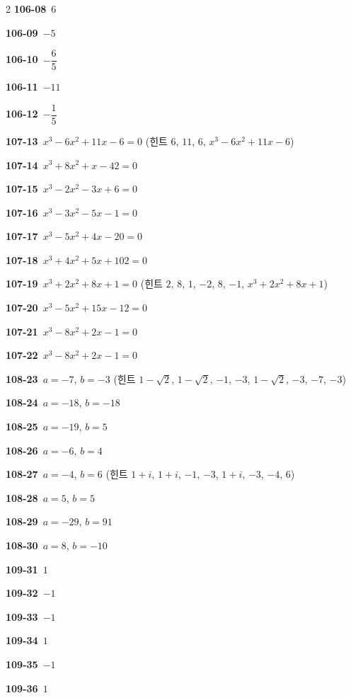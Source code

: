 \documentclass[10pt,a4paper]{article}
\begin{document}
\begin{multicols}{2}
\noindent\textbf{106-08}\ $6$\par
\noindent\textbf{106-09}\ $-5$\par
\noindent\textbf{106-10}\ $-\dfrac{6}{5}$\par
\noindent\textbf{106-11}\ $-11$\par
\noindent\textbf{106-12}\ $-\dfrac{1}{5}$\par
\noindent\textbf{107-13}\ $x^3-6x^2+11x-6=0$ (힌트 $6$, $11$, $6$, $x^3-6x^2+11x-6$)\par
\noindent\textbf{107-14}\ $x^3+8x^2+x-42=0$\par
\noindent\textbf{107-15}\ $x^3-2x^2-3x+6=0$\par
\noindent\textbf{107-16}\ $x^3-3x^2-5x-1=0$\par
\noindent\textbf{107-17}\ $x^3-5x^2+4x-20=0$\par
\noindent\textbf{107-18}\ $x^3+4x^2+5x+102=0$\par
\noindent\textbf{107-19}\ $x^3+2x^2+8x+1=0$ (힌트 $2$, $8$, $1$, $-2$, $8$, $-1$, $x^3+2x^2+8x+1$)\par
\noindent\textbf{107-20}\ $x^3-5x^2+15x-12=0$\par
\noindent\textbf{107-21}\ $x^3-8x^2+2x-1=0$\par
\noindent\textbf{107-22}\ $x^3-8x^2+2x-1=0$\par
\noindent\textbf{108-23}\ $a=-7$, $b=-3$ (힌트 $1-\sqrt{2}$, $1-\sqrt{2}$, $-1$, $-3$, $1-\sqrt{2}$, $-3$, $-7$, $-3$)\par
\noindent\textbf{108-24}\ $a=-18$, $b=-18$\par
\noindent\textbf{108-25}\ $a=-19$, $b=5$\par
\noindent\textbf{108-26}\ $a=-6$, $b=4$\par
\noindent\textbf{108-27}\ $a=-4$, $b=6$ (힌트 $1+i$, $1+i$, $-1$, $-3$, $1+i$, $-3$, $-4$, $6$)\par
\noindent\textbf{108-28}\ $a=5$, $b=5$\par
\noindent\textbf{108-29}\ $a=-29$, $b=91$\par
\noindent\textbf{108-30}\ $a=8$, $b=-10$\par
\noindent\textbf{109-31}\ $1$\par
\noindent\textbf{109-32}\ $-1$\par
\noindent\textbf{109-33}\ $-1$\par
\noindent\textbf{109-34}\ $1$\par
\noindent\textbf{109-35}\ $-1$\par
\noindent\textbf{109-36}\ $1$\par

\end{multicols}
\end{document}
